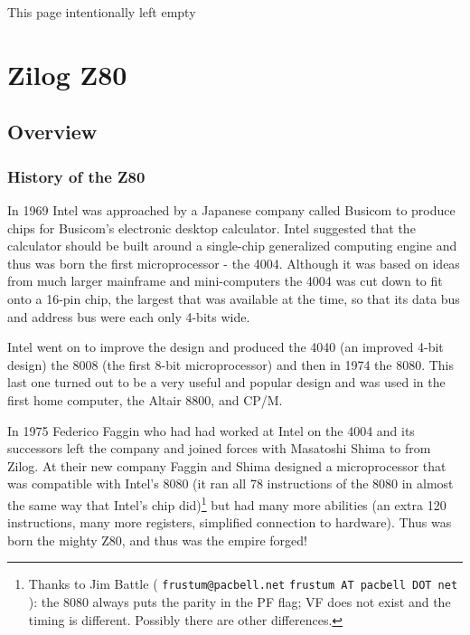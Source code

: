 \documentclass[12pt,twoside,openright,a4paper]{book}
\makeatletter
\newcommand{\IntentionallyEmpty}{
	\mbox{}
	\vfill
	\begin{center}
	This page intentionally left empty
	\end{center}
	\vfill
	\mbox{}
}
\newcommand*{\PRINTED}{}	%
\newcommand{\email}[3]{
	\ifdefined\PRINTED
		{\tt #1@#2.#3}
	\else
		{\tt #1 AT #2 DOT #3}
	\fi
}
\makeatother
\begin{document}
\pagebreak
\IntentionallyEmpty
\pagebreak


\chapter{Zilog Z80}


\minitoc

\pagebreak
\section{Overview}
\subsection{History of the Z80}

In 1969 Intel was approached by a Japanese company called Busicom to produce  chips for Busicom's electronic desktop calculator. Intel suggested that the calculator should be built around a single-chip generalized computing engine and thus was born the first microprocessor - the 4004. Although it was based on ideas from much larger mainframe and mini-computers the 4004 was cut down to fit onto a 16-pin chip, the largest that was available at the time, so that its data bus and address bus were each only 4-bits wide. 

Intel went on to improve the design and produced the 4040 (an improved 4-bit design) the 8008 (the first 8-bit microprocessor) and then in 1974 the 8080. This last one turned out to be a very useful and popular design and was used in the first home computer, the Altair 8800, and CP/M. 

In 1975 Federico Faggin who had had worked at Intel on the 4004 and its successors left the company and joined forces with Masatoshi Shima to from Zilog. At their new company Faggin and Shima designed a microprocessor that was compatible with Intel's 8080 (it ran all 78 instructions of the 8080 in almost the same way that Intel's chip did)\footnote{Thanks to Jim Battle (\email{frustum}{pacbell}{net}): the 8080 always puts the parity in the PF flag; VF does not exist and the timing is different. Possibly there are other differences.} but had many more abilities (an extra 120 instructions, many more registers, simplified connection to hardware). Thus was born the mighty Z80, and thus was the empire forged!
\end{document}
